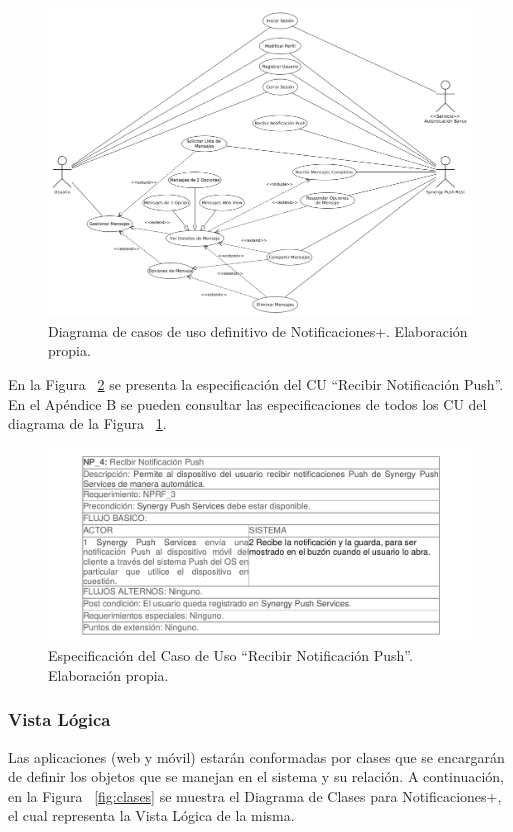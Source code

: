 \begin{figure}[H]
  \centering
  \includegraphics[scale=0.3,type=png,ext=.png,read=.png,angle=0,origin=c]{imagenes/Diagrama_de_Casos_de_Uso_v2_0}
  \caption{Diagrama de casos de uso definitivo de Notificaciones+. Elaboración propia.}
  \label{fig:cudef}
\end{figure}


En la Figura ~\ref{fig:cupush} se presenta la especificación del CU “Recibir Notificación Push”. En el Apéndice B se pueden consultar las especificaciones de todos los CU del diagrama de la Figura ~\ref{fig:cudef}.

\begin{figure}[ht]
  \centering
  \includegraphics[scale=0.4,type=png,ext=.png,read=.png,angle=0,origin=c]{imagenes/cupush}
  \caption{Especificación del Caso de Uso “Recibir Notificación Push”. Elaboración propia.}
  \label{fig:cupush}
\end{figure}


\subsubsection{Vista Lógica}
Las aplicaciones (web y móvil) estarán conformadas por clases que se encargarán de definir los objetos que se manejan en el sistema y su relación. A continuación, en la Figura ~\ref{fig:clases} se muestra el Diagrama de Clases para Notificaciones+, el cual representa la Vista Lógica de la misma. 

